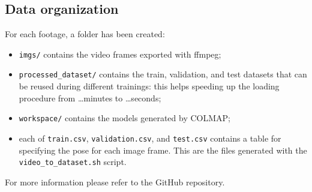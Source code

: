 \subsection{Data organization}
For each footage, a folder has been created:
\begin{itemize}
    \item \texttt{imgs/} contains the video frames exported with ffmpeg;
    \item \texttt{processed\_dataset/} contains the train, validation, and test datasets that can be reused during different trainings: this helps speeding up the loading procedure from \dots minutes to \dots seconds;
    \item \texttt{workspace/} contains the models generated by COLMAP;
    \item each of \texttt{train.csv}, \texttt{validation.csv}, and \texttt{test.csv} contains a table for specifying the pose for each image frame. This are the files generated with the \texttt{video\_to\_dataset.sh} script.
\end{itemize}

For more information please refer to the GitHub repository.
